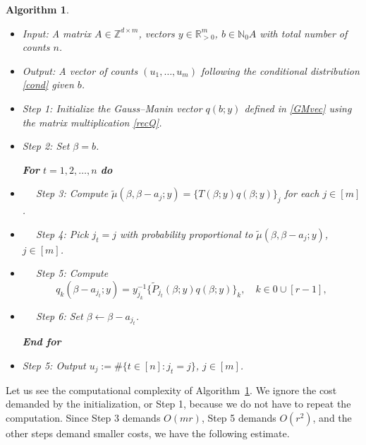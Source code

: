 \documentclass[a4paper,12pt]{article}
\theoremstyle{plain}
\newtheorem{algorithm}[theorem]{Algorithm}
\theoremstyle{remark}
\begin{document}
\begin{algorithm}\label{algo:1}~
    \begin{itemize}
  \item[] Input: A matrix $A\in\mathbb{Z}^{d\times m}$,
    vectors $y\in\mathbb{R}_{>0}^m$,  $b\in\mathbb{N}_0A$
    with total number of counts $n$.
  \item[] Output: A vector of counts $(u_1,\ldots,u_m)$
    following the conditional distribution \eqref{cond} given
    $b$.     
  \end{itemize}    
  \begin{itemize}
    \item [] Step 1: Initialize the Gauss--Manin vector
      $q(b;y)$ defined in \eqref{GMvec} using the matrix
      multiplication \eqref{recQ}.
    \item [] Step 2: Set $\beta=b$.

    \smallskip
    
    {\bf For} $t=1,2,\ldots,n$ {\bf do}

  \item [] ~~ Step 3: Compute
    $\tilde{\mu}(\beta,\beta-a_j;y)=\{T(\beta;y)q(\beta;y)\}_j$
    for each $j\in[m]$.

  \item [] ~~ Step 4: Pick $j_t=j$ with probability
    proportional to $\tilde{\mu}(\beta,\beta-a_j;y)$, $j\in[m]$.

  \item [] ~~ Step 5: Compute
      \[
        q_k(\beta-a_{j_t};y)=
        y_{j_k}^{-1}
        \{\tilde{P}_{j_t}(\beta;y)q(\beta;y)\}_k, \quad k\in 0\cup[r-1],
      \]

  \item [] ~~ Step 6: Set $\beta\leftarrow \beta-a_{j_t}$.

    \smallskip
    
    {\bf End for}

  \item [] Step 5: Output $u_j:=\#\{t\in[n]:j_t=j\}$, $j\in[m]$.
  \end{itemize}

\end{algorithm}

Let us see the computational complexity of Algorithm~\ref{algo:1}.
We ignore the cost demanded by the initialization, or Step 1,
because we do not have to repeat the computation. Since Step 3
demands $O(mr)$, Step 5 demands $O(r^2)$, and the other steps
demand smaller costs, we have the following estimate.
\end{document}
